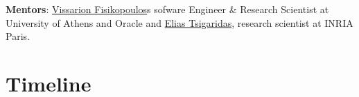 \documentclass[a4paper, 12pt]{article}
\def\R{{\tt R}}
\begin{document}

\textbf{Mentors}: \textcolor{blue}{\href{https://vissarion.github.io/}{Vissarion Fisikopoulos}}s sofware Engineer \& Research Scientist at University of Athens and Oracle and %
\textcolor{blue}{\href{https://who.paris.inria.fr/Elias.Tsigaridas/}{Elias Tsigaridas}}, research scientist at INRIA Paris.%

\section{Timeline}
\end{document}
